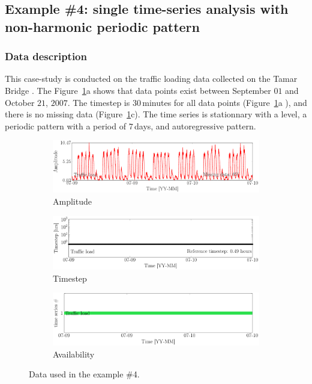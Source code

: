\subsection{Example \#4: single time-series analysis with non-harmonic periodic pattern}
\label{S:Example_TRAFFIC}
\subsubsection{Data description}

This case-study is conducted on the traffic loading data collected on the Tamar Bridge \citep{Goulet2017BDLMEmprical,Nguyen2019KRBDLM}. 
The Figure~\ref{fig:DataSummaryTraffic}a shows that data points exist between  September $01$ and October $21$, $2007$.
The timestep is $30$\,minutes for all data points (Figure~\ref{fig:DataSummaryTraffic}a ), and there is no missing data (Figure~\ref{fig:DataSummaryTraffic}c).
The time series is stationnary with a level, a periodic pattern with a period of $7$\,days, and autoregressive pattern.



\begin{figure}[h]
\centering
\begin{subfigure}{\linewidth}
\includegraphics[width=0.9\linewidth]{./docfigs/Example_TRAFFIC/raw/ALL_AMPLITUDES.pdf}
\caption{Amplitude}
\end{subfigure}
\begin{subfigure}{\linewidth}
\includegraphics[width=0.9\linewidth]{./docfigs/Example_TRAFFIC/raw/ALL_TIMESTEPS.pdf} 
\caption{Timestep}
\end{subfigure}
\begin{subfigure}{\linewidth}
\includegraphics[width=0.9\linewidth]{./docfigs/Example_TRAFFIC/raw/AVAILABILITY.pdf}
\caption{Availability}
\end{subfigure}
\caption{Data used in the example \#4.}
\label{fig:DataSummaryTraffic}
\end{figure}


